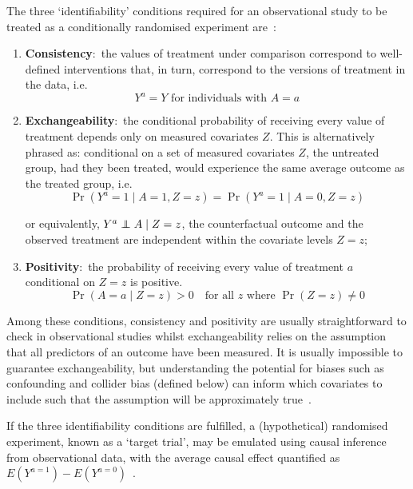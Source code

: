 The three `identifiability' conditions required for an observational study to be treated as a conditionally randomised experiment are~\parencite{Hernan2023-de}:
%
\begin{enumerate}
    \item \textbf{Consistency}:\ the values of treatment under comparison correspond to well-defined interventions that, in turn, correspond to the versions of treatment in the data, i.e.
          \[
              Y^a = Y \text{ for individuals with } A = a
          \]

    \item \textbf{Exchangeability}:\ the conditional probability of receiving every value of treatment depends only on measured covariates $Z$. This is alternatively phrased as: conditional on a set of measured covariates $Z$, the untreated group, had they been treated, would experience the same average outcome as the treated group, i.e.
          \[
              \Pr(Y^a = 1 \mid A = 1, Z = z) = \Pr(Y^a = 1 \mid A = 0, Z = z)
          \]

          or equivalently, $Y^a \mathrel{\perp\!\!\!\!\perp} A \mid Z = z$, the counterfactual outcome and the observed treatment are independent within the covariate levels $Z = z$;

    \item \textbf{Positivity}:\ the probability of receiving every value of treatment $a$ conditional on $Z = z$ is positive.
          \[
              \Pr(A = a \mid Z = z) > 0 \quad\text{for all } z \text{ where } \Pr(Z = z) \neq 0
          \]

\end{enumerate}

Among these conditions, consistency and positivity are usually straightforward to check in observational studies whilst exchangeability relies on the assumption that all predictors of an outcome have been measured. It is usually impossible to guarantee exchangeability, but understanding the potential for biases such as confounding and collider bias (defined below) can inform which covariates to include such that the assumption will be approximately true~\parencite{Hernan2023-de}.

If the three identifiability conditions are fulfilled, a (hypothetical) randomised experiment, known as a `target trial', may be emulated using causal inference from observational data, with the average causal effect quantified as $E(Y^{a = 1}) - E(Y^{a = 0})$~\parencite{Hernan2016-be}.

